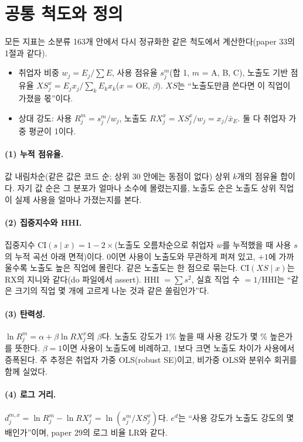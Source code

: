 \documentclass[11pt]{article}
\begin{document}
\section{공통 척도와 정의}

모든 지표는 소분류 163개 안에서 다시 정규화한 같은 척도에서 계산한다(paper 33의 1절과 같다).
\begin{itemize}[leftmargin=*]
  \item 취업자 비중 $w_j = E_j / \sum E$, 사용 점유율 $s^m_j$(합 1, $m$ = A, B, C), 노출도 기반 점유율 $XS^x_j = E_j x_j / \sum_k E_k x_k$($x$ = OE, $\beta$). $XS$는 ``노출도만큼 쓴다면 이 직업이 가졌을 몫''이다.
  \item 상대 강도: 사용 $R^m_j = s^m_j / w_j$, 노출도 $RX^x_j = XS^x_j / w_j = x_j / \bar{x}_E$. 둘 다 취업자 가중 평균이 1이다.
\end{itemize}

\paragraph{(1) 누적 점유율.} 값 내림차순(같은 값은 코드 순; 상위 30 안에는 동점이 없다) 상위 $k$개의 점유율 합이다. 자기 값 순은 그 분포가 얼마나 소수에 몰렸는지를, 노출도 순은 노출도 상위 직업이 실제 사용을 얼마나 가졌는지를 본다.

\paragraph{(2) 집중지수와 HHI.} 집중지수 $\mathrm{CI}(s \mid x) = 1 - 2 \times$(노출도 오름차순으로 취업자 $w$를 누적했을 때 사용 $s$의 누적 곡선 아래 면적)이다. 0이면 사용이 노출도와 무관하게 퍼져 있고, $+1$에 가까울수록 노출도 높은 직업에 몰린다. 같은 노출도는 한 점으로 묶는다. $\mathrm{CI}(XS \mid x)$는 RX의 지니와 같다(do 파일에서 assert). HHI $= \sum s^2$, 실효 직업 수 $= 1/\mathrm{HHI}$는 ``같은 크기의 직업 몇 개에 고르게 나눈 것과 같은 쏠림인가''다.

\paragraph{(3) 탄력성.} $\ln R^m_j = \alpha + \beta \ln RX^x_j$의 $\beta$다. 노출도 강도가 1\% 높을 때 사용 강도가 몇 \% 높은가를 뜻한다. $\beta = 1$이면 사용이 노출도에 비례하고, 1보다 크면 노출도 차이가 사용에서 증폭된다. 주 추정은 취업자 가중 OLS(robust SE)이고, 비가중 OLS와 분위수 회귀를 함께 실었다.

\paragraph{(4) 로그 거리.} $d^{m,x}_j = \ln R^m_j - \ln RX^x_j = \ln(s^m_j / XS^x_j)$다. $e^d$는 ``사용 강도가 노출도 강도의 몇 배인가''이며, paper 29의 로그 비율 LR와 같다.
\end{document}
